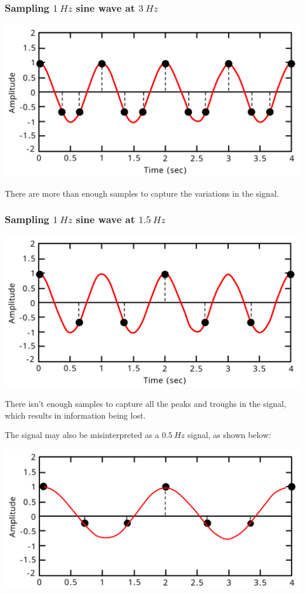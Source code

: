 \documentclass[11pt]{article}
\begin{document}
\subsubsection{Sampling \(\qty{1}{Hz}\) sine wave at \(\qty{3}{Hz}\)}
\label{sec:orgb8a2a56}
\begin{center}
\includegraphics[width=.9\linewidth]{./images/sampling-1hz-sine-wave-at-3hz.png}
\end{center}

There are more than enough samples to capture the variations in the signal.

 \newpage
\subsubsection{Sampling \(\qty{1}{Hz}\) sine wave at \(\qty{1.5}{Hz}\)}
\label{sec:orgb211fe2}
\begin{center}
\includegraphics[width=.9\linewidth]{./images/sampling-1hz-sine-wave-at-1.5hz.png}
\end{center}

There isn't enough samples to capture all the peaks and troughs in the signal, which results in information being lost.

The signal may also be misinterpreted as a \(\qty{0.5}{Hz}\) signal, as shown below:
\begin{center}
\includegraphics[width=.9\linewidth]{./images/sampling-0.5hz-sine-wave.png}
\end{center}
\end{document}
